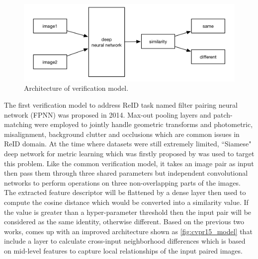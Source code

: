 \begin{figure}
    \includegraphics[width=\linewidth]{figures/verification_model.png}
    \caption{Architecture of verification model.}
    \label{fig:vft_model}
\end{figure}

The first verification model to address ReID task named filter pairing
neural network (FPNN) \cite{first-pairwise-net-for-reid-2014} was proposed in 
2014. Max-out pooling layers and patch-matching were employed to jointly handle 
geometric transforms and photometric, misalignment, background clutter and 
occlusions which are common issues in ReID domain.
At the time where datasets were still extremely limited, ``Siamese" deep 
network for metric learning which was firstly
proposed by \cite{first-siamese-net-for-reid-2014} was used to target this problem. 
Like the common verification model, it takes an image pair as input then pass 
them through three shared parameters but independent convolutional networks to 
perform operations on three non-overlapping parts of the images. The extracted 
feature descriptor will be flattened by a dense layer then used to
compute the cosine distance which would be converted into a similarity value. 
If the value is greater than a hyper-parameter threshold then the input pair 
will be considered as the same identity, otherwise different.
Based on the previous two works, \cite{an-improved-dl-archit-2015} comes up 
with an improved architecture shown as \autoref{fig:cvpr15_model} that include 
a layer to calculate cross-input neighborhood differences which is based on 
mid-level features to capture local relationships of the input paired images.

